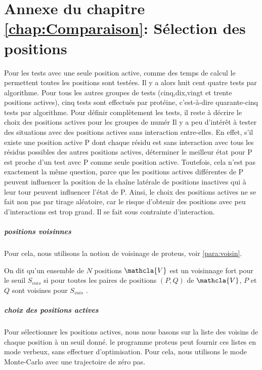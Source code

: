 \chapter*{Annexe du chapitre \ref{chap:Comparaison}: Sélection des positions }
\label{chap:annexe1}

Pour les tests avec une seule position active, comme des temps de calcul le permettent toutes les positions sont testées. Il y a alors huit cent quatre tests par algorithme.
Pour tous les autres groupes de tests (cinq,dix,vingt et trente positions actives), cinq tests sont effectués par protéine, c'est-à-dire quarante-cinq tests par algorithme.
Pour définir complètement les tests, il reste à décrire le choix des positions actives pour les groupes de numér
Il y a peu d'intérêt à tester des situations avec des positions actives sans interaction entre-elles.
En effet, s'il existe une position active P dont chaque résidu est sans interaction avec tous les résidus possibles des autres positions actives, déterminer le meilleur état pour P est proche d'un test avec P comme seule position active. Toutefois, cela n'est pas exactement la même question, parce que les positions actives différentes de P peuvent influencer la position de la chaîne latérale de positions inactives qui à leur tour peuvent influencer l'état de P.
Ainsi, le choix des positions actives ne se fait non pas par tirage aléatoire, car le risque d'obtenir des positions avec peu d'interactions est trop grand. Il se fait sous contrainte d'interaction.

\paragraph{positions voisinnes}
Pour cela, nous utilisons la notion de voisinage de proteus, voir \ref{para:voisin}.


On dit qu'un ensemble de $N$ positions $\mathcla{V}$ est un \og voisinnage fort \fg  pour le seuil $S_{vois}$ si pour toutes les paires de positions $(P,Q)$ de $\mathcla{V}$, $P$ et $Q$ sont voisines pour $S_{vois}$ .

\paragraph{choix des  positions actives}
Pour sélectionner les positions actives, nous nous basons sur la liste des voisins de chaque position à un seuil donné. le programme proteus peut fournir ces listes en mode verbeux, sans effectuer d'optimisation. Pour cela, nous utilisons le mode Monte-Carlo avec une trajectoire de zéro pas. 

